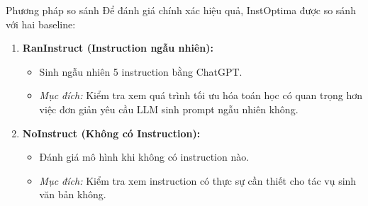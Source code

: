 \documentclass[12pt,xcolor=table]{beamer}
\begin{document}
\begin{frame}{Phương pháp so sánh}
    Để đánh giá chính xác hiệu quả, InstOptima được so sánh với hai baseline:
    \vspace{0.3cm}
    \begin{enumerate}
        \item \textbf{RanInstruct (Instruction ngẫu nhiên):}
        \begin{itemize}
            \item Sinh ngẫu nhiên 5 instruction bằng ChatGPT.
            \item \textit{Mục đích:} Kiểm tra xem quá trình tối ưu hóa toán học có quan trọng hơn việc đơn giản yêu cầu LLM sinh prompt ngẫu nhiên không.
        \end{itemize}
        \vspace{0.3cm}
        \item \textbf{NoInstruct (Không có Instruction):}
        \begin{itemize}
            \item Đánh giá mô hình khi không có instruction nào.
            \item \textit{Mục đích:} Kiểm tra xem instruction có thực sự cần thiết cho tác vụ sinh văn bản không.
        \end{itemize}
    \end{enumerate}
\end{frame}
\end{document}
